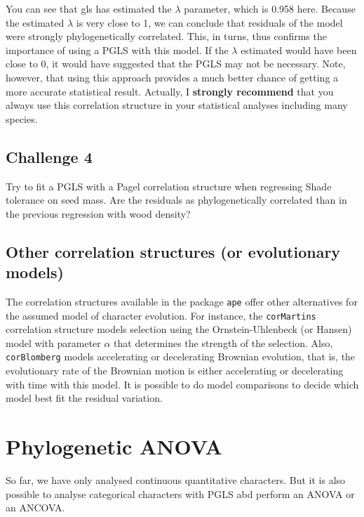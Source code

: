\documentclass[
]{book}
\begin{document}
You can see that gls has estimated the \(\lambda\) parameter, which is 0.958 here. Because the estimated \(\lambda\) is very close to 1, we can conclude that residuals of the model were strongly phylogenetically correlated. This, in turns, thus confirms the importance of using a PGLS with this model. If the \(\lambda\) estimated would have been close to 0, it would have suggested that the PGLS may not be necessary. Note, however, that using this approach provides a much better chance of getting a more accurate statistical result. Actually, I \textbf{strongly recommend} that you always use this correlation structure in your statistical analyses including many species.

\section{Challenge 4}\label{challenge-4}

Try to fit a PGLS with a Pagel correlation structure when regressing Shade tolerance on seed mass. Are the residuals as phylogenetically correlated than in the previous regression with wood density?

\section{Other correlation structures (or evolutionary models)}\label{other-correlation-structures-or-evolutionary-models}

The correlation structures available in the package \texttt{ape} offer other alternatives for the assumed model of character evolution. For instance, the \texttt{corMartins} correlation structure models selection using the Ornstein-Uhlenbeck (or Hansen) model with parameter \(\alpha\) that determines the strength of the selection. Also, \texttt{corBlomberg} models accelerating or decelerating Brownian evolution, that is, the evolutionary rate of the Brownian motion is either accelerating or decelerating with time with this model. It is possible to do model comparisons to decide which model best fit the residual variation.

\chapter{Phylogenetic ANOVA}\label{phylogenetic-anova}

So far, we have only analysed continuous quantitative characters. But it is also possible to analyse categorical characters with PGLS abd perform an ANOVA or an ANCOVA.
\end{document}
